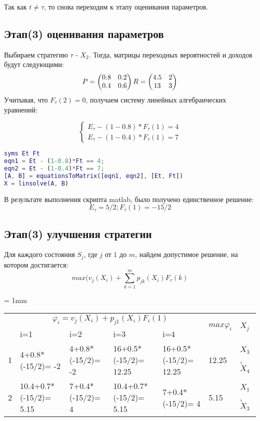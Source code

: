 Так как $t\neq\tau$, то снова переходим к этапу оценивания параметров.


\subsection{Этап(3) оценивания параметров}
Выбираем стратегию $\tau$ - $X_2$.  Тогда, матрицы переходных вероятностей и доходов будут следующими:
\begin{equation*}
P=\begin{pmatrix}
0.8 & 0.2\\
0.4 & 0.6
\end{pmatrix}\\
R=\begin{pmatrix}
4.5 & 2\\
13 & 3
\end{pmatrix}
\end{equation*}
Учитывая, что  $F_{\tau}(2)=0$, получаем систему линейных алгебраических уравнений:

\begin{equation*}
\begin{cases}
E_{\tau}-(1-0.8)*F_{\tau}(1)=4\\
E_{\tau}-(1-0.4)*F_{\tau}(1)=7
\end{cases}
\end{equation*}
\begin{lstlisting}[language={matlab}, caption={Скрпит для решения системы уравнений}, basicstyle=\ttfamily]
syms Et Ft
eqn1 = Et - (1-0.8)*Ft == 4;
eqn2 = Et - (1-0.4)*Ft == 7;
[A, B] = equationsToMatrix([eqn1, eqn2], [Et, Ft])
X = linsolve(A, B)
\end{lstlisting}
В результате выполнения скрипта matlab, было получено единственное решение:
\begin{equation*}
E_{\tau}=5/2; F_{\tau}(1)=-15/2
\end{equation*}


\subsection{Этап(3) улучшения стратегии}
Для каждого состояния $S_j$, где $j$ от $1$ до $m$, найдем допустимое решение, на котором достигается:
\begin{equation*}
max(v_j(X_i)+\sum_{k=1}^mp_{jk}(X_i)F_{\tau}(k)
\end{equation*}


\tabulinesep = 1mm
\begin{longtabu} to \textwidth {|X[1, c , m ] |X[3, c , m ] | X[3,c , m ]|X[3,c , m ]|X[3,c , m ]| X[2,c , m ]|X[1,c , m ]|}\firsthline\hline

 &  &  & \\ 
&i=1&i=2&i=3&i=4&&\\ &4+0.8*(-15/2)= -2&4+0.8*(-15/2)= -2&16+0.5*(-15/2)= 12.25&16+0.5*(-15/2)= 12.25&12.25&$X_3$, $X_4$\\ &10.4+0.7*(-15/2)= 5.15&7+0.4*(-15/2)= 4&10.4+0.7*(-15/2)= 5.15&7+0.4*(-15/2)= 4&5.15&$X_1$, $X_3$\\ \hline
\end{longtabu}

